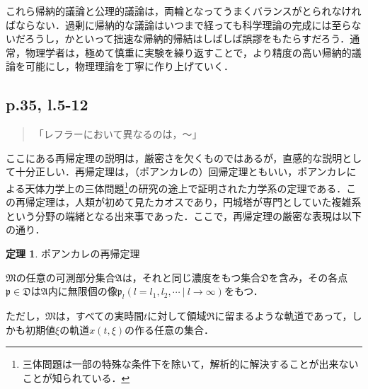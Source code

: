\documentclass[10pt, a5paper, twoside]{jsarticle}
\theoremstyle{definition}
\newtheorem{thm}{定理}
\begin{document}
                これら帰納的議論と公理的議論は，両輪となってうまくバランスがとられなければならない．過剰に帰納的な議論はいつまで経っても科学理論の完成には至らないだろうし，かといって拙速な帰納的帰結はしばしば誤謬をもたらすだろう．通常，物理学者は，極めて慎重に実験を繰り返すことで，より精度の高い帰納的議論を可能にし，物理理論を丁寧に作り上げていく．


            \subsection{p.35, l.5-12}

                \begin{quote}

                    「レフラーにおいて異なるのは，〜」

                \end{quote}

                ここにある再帰定理の説明は，厳密さを欠くものではあるが，直感的な説明として十分正しい．再帰定理は，（ポアンカレの）回帰定理ともいい，ポアンカレによる天体力学上の三体問題\footnote{三体問題は一部の特殊な条件下を除いて，解析的に解決することが出来ないことが知られている．}の研究の途上で証明された力学系の定理である．この再帰定理は，人類が初めて見たカオスであり，円城塔が専門としていた複雑系という分野の端緒となる出来事であった．ここで，再帰定理の厳密な表現は以下の通り\cite{pla}．

                \begin{thm}
                    ポアンカレの再帰定理

                    $\mathfrak{M}$の任意の可測部分集合$\mathfrak{A}$は，それと同じ濃度をもつ集合$\mathfrak{D}$を含み，その各点$\mathfrak{p} \in \mathfrak{D}$は$\mathfrak{A}$内に無限個の像$\mathfrak{p}_l (l = l_1, l_2, \cdots \ | \ l \to \infty)$をもつ．

                    ただし，$\mathfrak{M}$は，すべての実時間$t$に対して領域$\mathfrak{R}$に留まるような軌道であって，しかも初期値$\xi$の軌道$x(t, \xi)$の作る任意の集合．
                \end{thm}
\end{document}
